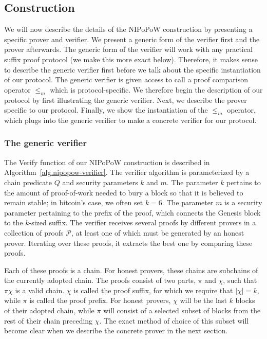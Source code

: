 \subsection{Construction}

We will now describe the details of the NIPoPoW construction by presenting a
specific prover and verifier. We present a generic form of the verifier first
and the prover afterwards. The generic form of the verifier will work with any
practical suffix proof protocol (we make this more exact below). Therefore, it
makes sense to describe the generic verifier first before we talk about the
specific instantiation of our protocol. The generic verifier is given access to
call a proof comparison operator $\leq_m$ which is protocol-specific. We
therefore begin the description of our protocol by first illustrating the
generic verifier. Next, we describe the prover specific to our protocol.
Finally, we show the instantiation of the $\leq_m$ operator, which plugs into
the generic verifier to make a concrete verifier for our protocol.

\subsubsection{The generic verifier}

The \textsf{Verify} function of our NIPoPoW construction is described in
Algorithm~\ref{alg.nipopow-verifier}. The verifier algorithm is parameterized by
a chain predicate $Q$ and security parameters $k$ and $m$. The parameter $k$
pertains to the amount of proof-of-work needed to bury a block so that it is
believed to remain stable; in bitcoin's case, we often set $k = 6$. The
parameter $m$ is a security parameter pertaining to the prefix of the proof,
which connects the Genesis block to the $k$-sized suffix.  The verifier receives
several proofs by different provers in a collection of proofs $\mathcal{P}$, at
least one of which must be generated by an honest prover. Iterating over these
proofs, it extracts the best one by comparing these proofs.

Each of these proofs is a chain. For honest provers, these
chains are subchains of the currently adopted chain. The proofs consist of two
parts, $\pi$ and $\chi$, such that $\pi \chi$ is a valid chain. $\chi$ is called
the proof suffix, for which we require that $|\chi| = k$, while $\pi$ is called
the proof prefix. For honest provers, $\chi$ will be the last $k$ blocks of
their adopted chain, while $\pi$ will consist of a selected subset of blocks
from the rest of their chain preceding $\chi$. The exact method of choice of
this subset will become clear when we describe the concrete prover in the next
section.

